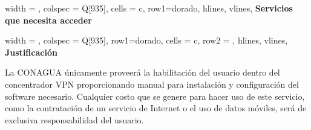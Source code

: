 \documentclass[letterpaper,9pt]{article}
\begin{document}
\begin{longtblr}[
	label = none,
	entry = none,
	]{
                    	width = \linewidth,
		colspec = {Q[935]},
		cells = {c},
                     row{1}={dorado},
		hlines,
		vlines,
	}
	\textbf{Servicios que necesita acceder} \\\SERVICIOS  
\end{longtblr}

\begin{longtblr}[
	label = none,
	entry = none,
	]{
		width = \linewidth,
		colspec = {Q[935]},
                     row{1}={dorado},
		cells = {c},
		row{2} = {},
		hlines,
		vlines,
	}
	\textbf{Justificación} \\\JUSTIFICACION
\end{longtblr}
\clearpage

La CONAGUA únicamente proveerá la habilitación del usuario dentro del concentrador VPN  proporcionando manual  para instalación y configuración del software necesario. Cualquier costo que se genere para hacer uso de este servicio, como la contratación de un servicio de Internet  o el uso de datos móviles, será de exclusiva responsabilidad del usuario.
\end{document}
